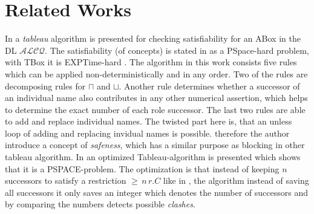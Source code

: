 \documentclass{book}
\theoremstyle{break}
\theoremstyle{definition}
\begin{document}
\section{Related Works}
In \cite{1} a \textit{tableau} algorithm is presented for checking satisfiability for an ABox in the DL $\mathcal{ALCQ}$. The satisfiability (of concepts) is stated in \cite{1} as a PSpace-hard problem, with TBox it is EXPTime-hard \cite{4}. The algorithm in this work consists five rules which can be applied non-deterministically and in any order. Two of the rules are decomposing rules for $\sqcap$ and $\sqcup$. Another rule determines whether a successor of an individual name also contributes in any other numerical assertion, which helps to determine the exact number of each role successor. The last two rules are able to add and replace individual names. The twisted part here is, that an unless loop of adding and replacing invidual names is possible. therefore the author introduce a concept of \textit{safeness}, which has a similar purpose as blocking in other tableau algorithm. In \cite{pspace} an optimized Tableau-algorithm is presented which shows that it is a PSPACE-problem. The optimization is that instead of keeping $n$ successors to satisfy a restriction $\geq\,n\,r.C$ like in \cite{1}, the algorithm instead of saving all successors it only saves an integer which denotes the number of successors and by comparing the numbers detects possible \textit{clashes}.\\
\end{document}

